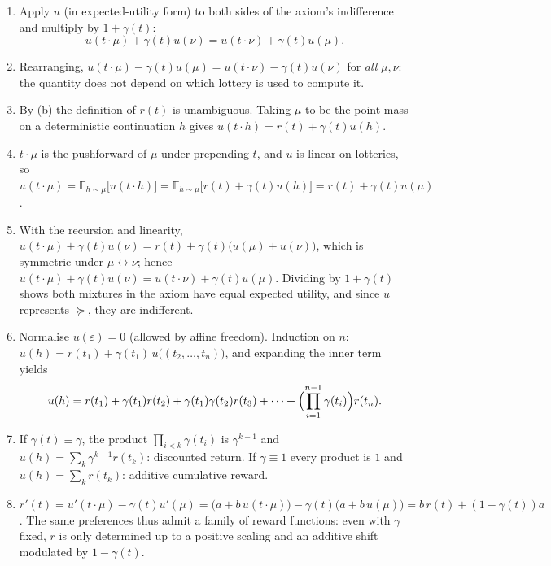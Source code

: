 \documentclass[11pt]{article}
\newcommand{\pref}{\succcurlyeq}
\newcommand{\emptytraj}{\varepsilon}
\begin{document}
\begin{solution}
\begin{enumerate}[label=(\alph*)]
\item Apply $u$ (in expected-utility form) to both sides of the axiom's
indifference and multiply by $1+\gamma(t)$:
\[
u(t\cdot\mu)+\gamma(t)u(\nu)=u(t\cdot\nu)+\gamma(t)u(\mu).
\]
\item Rearranging, $u(t\cdot\mu)-\gamma(t)u(\mu)=u(t\cdot\nu)-\gamma(t)u(\nu)$
for \emph{all} $\mu,\nu$: the quantity does not depend on which lottery is
used to compute it.
\item By (b) the definition of $r(t)$ is unambiguous. Taking $\mu$ to be the
point mass on a deterministic continuation $h$ gives
$u(t\cdot h)=r(t)+\gamma(t)u(h)$.
\item $t\cdot\mu$ is the pushforward of $\mu$ under prepending $t$, and $u$
is linear on lotteries, so
$u(t\cdot\mu)=\mathbb{E}_{h\sim\mu}\bigl[u(t\cdot h)\bigr]
=\mathbb{E}_{h\sim\mu}\bigl[r(t)+\gamma(t)u(h)\bigr]=r(t)+\gamma(t)u(\mu)$.
\item With the recursion and linearity,
$u(t\cdot\mu)+\gamma(t)u(\nu)=r(t)+\gamma(t)\bigl(u(\mu)+u(\nu)\bigr)$,
which is symmetric under $\mu\leftrightarrow\nu$; hence
$u(t\cdot\mu)+\gamma(t)u(\nu)=u(t\cdot\nu)+\gamma(t)u(\mu)$. Dividing by
$1+\gamma(t)$ shows both mixtures in the axiom have equal expected utility,
and since $u$ represents $\pref$, they are indifferent.
\item Normalise $u(\emptytraj)=0$ (allowed by affine freedom). Induction on
$n$: $u(h)=r(t_1)+\gamma(t_1)\,u\bigl((t_2,\dots,t_n)\bigr)$, and expanding
the inner term yields
\[
u(h)=r(t_1)+\gamma(t_1)r(t_2)+\gamma(t_1)\gamma(t_2)r(t_3)+\cdots+
\Bigl(\prod_{i=1}^{n-1}\gamma(t_i)\Bigr)r(t_n).
\]
\item If $\gamma(t)\equiv\gamma$, the product $\prod_{i<k}\gamma(t_i)$ is
$\gamma^{k-1}$ and $u(h)=\sum_k \gamma^{k-1}r(t_k)$: discounted return. If
$\gamma\equiv 1$ every product is $1$ and $u(h)=\sum_k r(t_k)$: additive
cumulative reward.
\item $r'(t)=u'(t\cdot\mu)-\gamma(t)u'(\mu)
=\bigl(a+b\,u(t\cdot\mu)\bigr)-\gamma(t)\bigl(a+b\,u(\mu)\bigr)
=b\,r(t)+(1-\gamma(t))a$. The same preferences thus admit a family of reward
functions: even with $\gamma$ fixed, $r$ is only determined up to a positive
scaling and an additive shift modulated by $1-\gamma(t)$.
\end{enumerate}
\end{solution}
\end{document}
